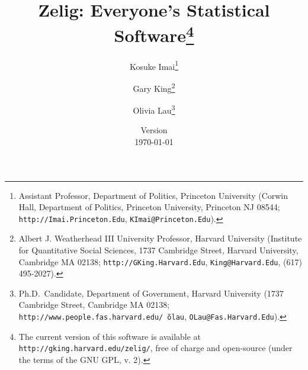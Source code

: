 \title{Zelig: Everyone's Statistical Software\thanks{The current
    version of this software is available at
    \texttt{http://gking.harvard.edu/zelig/}, free of charge and
    open-source (under the terms of the GNU GPL, v. 2).}}
\author{Kosuke
  Imai\thanks{Assistant Professor, Department of Politics, Princeton
    University (Corwin Hall, Department of Politics, Princeton
    University, Princeton NJ 08544; \texttt{http://Imai.Princeton.Edu},
    \texttt{KImai@Princeton.Edu}).}
\and %
Gary King\thanks{Albert J. Weatherhead III University Professor, Harvard
  University (Institute for Quantitative Social Sciences, 1737 Cambridge 
Street, Harvard University, Cambridge MA 02138;
  \texttt{http://GKing.Harvard.Edu}, \texttt{King@Harvard.Edu}, (617)
  495-2027).}
\and %
Olivia Lau\thanks{Ph.D.\ Candidate, Department of Government, Harvard
  University (1737 Cambridge Street, Cambridge MA 02138;
  \texttt{http://www.people.fas.harvard.edu/\~\,olau},
  \texttt{OLau@Fas.Harvard.Edu}).}}


\date{Version \\ \today}
